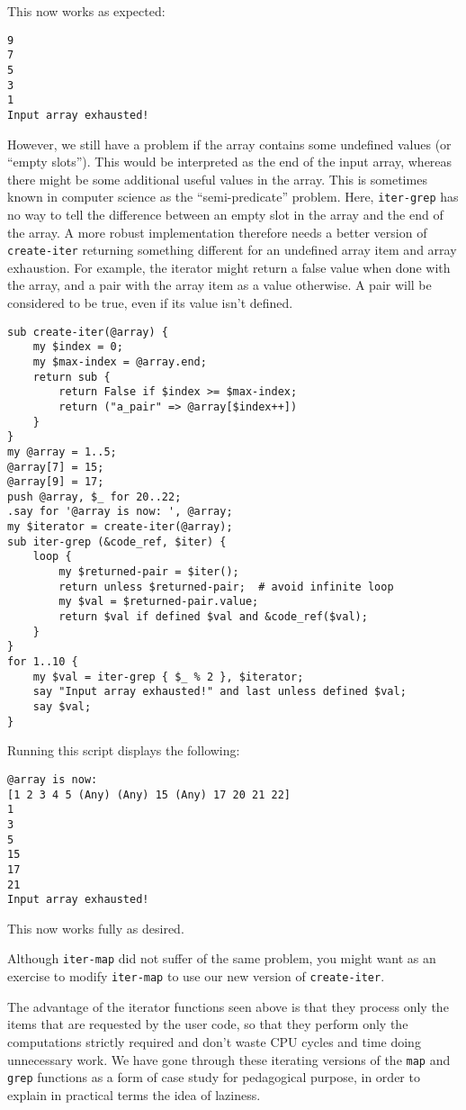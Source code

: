 This now works as expected:

\begin{verbatim}
9
7
5
3
1
Input array exhausted!
\end{verbatim}

However, we still have a problem if the array 
contains some undefined values (or ``empty slots''). This 
would be interpreted as the end of the input array, whereas 
there might be some additional useful values in the array. 
This is sometimes known in computer science as the 
``semi-predicate'' problem. Here, {\tt iter-grep} has no 
way to tell the difference between an empty slot in the array 
and the end of the array. A more robust implementation 
therefore needs a better version of {\tt create-iter}  
returning something different for an undefined array item 
and array exhaustion. For example, the iterator might return 
a false value when done with the array, and a pair with the 
array item as a value otherwise. A pair will be considered 
to be true, even if its value isn't defined. 

\begin{verbatim}
sub create-iter(@array) {
    my $index = 0;
    my $max-index = @array.end;
    return sub { 
    	return False if $index >= $max-index; 
        return ("a_pair" => @array[$index++]) 
    }
}
my @array = 1..5;
@array[7] = 15;
@array[9] = 17;
push @array, $_ for 20..22;
.say for '@array is now: ', @array;
my $iterator = create-iter(@array);
sub iter-grep (&code_ref, $iter) {
	loop {
		my $returned-pair = $iter();
		return unless $returned-pair;  # avoid infinite loop
		my $val = $returned-pair.value;
	    return $val if defined $val and &code_ref($val);
	}
}
for 1..10 {
	my $val = iter-grep { $_ % 2 }, $iterator;
	say "Input array exhausted!" and last unless defined $val;
	say $val;
}
\end{verbatim}

Running this script displays the following:
\begin{verbatim}
@array is now:
[1 2 3 4 5 (Any) (Any) 15 (Any) 17 20 21 22]
1
3
5
15
17
21
Input array exhausted!
\end{verbatim}

This now works fully as desired.

Although {\tt iter-map} did not suffer of the same problem, 
you might want as an exercise to modify {\tt iter-map}
to use our new version of {\tt create-iter}.

The advantage of the iterator functions seen above is that they 
process only the items that are requested by the user code, so 
that they perform only the computations strictly required and 
don't waste CPU cycles and time doing unnecessary work. We have 
gone through these iterating versions of the {\tt map} 
and {\tt grep} functions as a form of case study for 
pedagogical purpose, in order to explain in practical terms 
the idea of laziness. 

